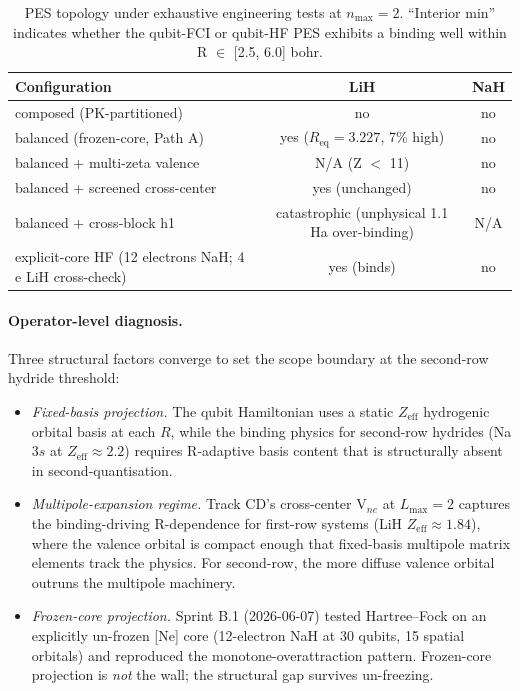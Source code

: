 \documentclass[twocolumn,pra,amsmath,amssymb,superscriptaddress]{revtex4-2}
\begin{document}
\begin{table}[h]
  \centering
  \caption{PES topology under exhaustive engineering tests at
    $n_{\max}=2$.  ``Interior min'' indicates whether the qubit-FCI or
    qubit-HF PES exhibits a binding well within R $\in$ [2.5, 6.0] bohr.}
  \label{tab:scope}
  \begin{tabular}{lcc}
    \toprule
    Configuration & LiH & NaH \\
    \midrule
    composed (PK-partitioned) & no & no \\
    balanced (frozen-core, Path A) & yes ($R_{\mathrm{eq}}=3.227$, 7\% high) & no \\
    balanced + multi-zeta valence & N/A (Z $<$ 11) & no \\
    balanced + screened cross-center & yes (unchanged) & no \\
    balanced + cross-block h1 & catastrophic (unphysical 1.1 Ha over-binding) & N/A \\
    explicit-core HF (12 electrons NaH; 4 e LiH cross-check) & yes (binds) & no \\
    \bottomrule
  \end{tabular}
\end{table}

\paragraph{Operator-level diagnosis.}  Three structural factors converge
to set the scope boundary at the second-row hydride threshold:
\begin{itemize}
  \item \emph{Fixed-basis projection.}  The qubit Hamiltonian uses a
    static $Z_{\text{eff}}$ hydrogenic orbital basis at each $R$, while
    the binding physics for second-row hydrides (Na $3s$ at
    $Z_{\text{eff}} \approx 2.2$) requires R-adaptive basis content
    that is structurally absent in second-quantisation.
  \item \emph{Multipole-expansion regime.}  Track CD's cross-center
    V$_{ne}$ at $L_{\max}=2$ captures the binding-driving R-dependence
    for first-row systems (LiH $Z_{\text{eff}} \approx 1.84$), where
    the valence orbital is compact enough that fixed-basis multipole
    matrix elements track the physics.  For second-row, the more
    diffuse valence orbital outruns the multipole machinery.
  \item \emph{Frozen-core projection.}  Sprint B.1 (2026-06-07) tested
    Hartree--Fock on an explicitly un-frozen [Ne] core (12-electron
    NaH at 30 qubits, 15 spatial orbitals) and reproduced the
    monotone-overattraction pattern.  Frozen-core projection is
    \emph{not} the wall; the structural gap survives un-freezing.
\end{itemize}
\end{document}
